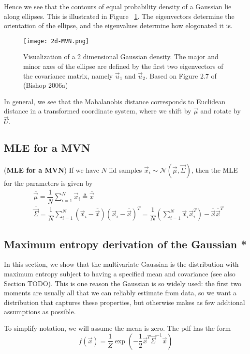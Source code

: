 Hence we see that the contours of equal probability density of a Gaussian lie along ellipses. This is illustrated in Figure ~\ref{fig:2d-MVN}. The eigenvectors determine the orientation of the ellipse, and the eigenvalues determine how elogonated it is.

\begin{figure}[hbtp]
\centering
    \texttt{[image: 2d-MVN.png]}
\caption{Visualization of a 2 dimensional Gaussian density. The major and minor axes of the ellipse are defined by the first two eigenvectors of the covariance matrix, namely $\vec{u}_1$ and $\vec{u}_2$. Based on Figure 2.7 of (Bishop 2006a)}
\label{fig:2d-MVN} 
\end{figure}

In general, we see that the Mahalanobis distance corresponds to Euclidean distance in a transformed coordinate system, where we shift by $\vec{\mu}$ and rotate by $\vec{U}$.


\subsection{MLE for a MVN}
\begin{theorem}(\textbf{MLE for a MVN})
If we have $N$ iid samples $\vec{x}_i \sim \mathcal{N}(\vec{\mu},\vec{\Sigma})$, then the MLE for the parameters is given by
\begin{align}
& \bar{\vec{\mu}}=\dfrac{1}{N}\sum\limits_{i=1}^N \vec{x}_i \triangleq \bar{\vec{x}} \\
& \bar{\vec{\Sigma}}=\dfrac{1}{N}\sum\limits_{i=1}^N (\vec{x}_i-\bar{\vec{x}})(\vec{x}_i-\bar{\vec{x}})^T=\dfrac{1}{N}\left(\sum\limits_{i=1}^N \vec{x}_i\vec{x}_i^T\right)-\bar{\vec{x}}\bar{\vec{x}}^T
\end{align}
\end{theorem}


\subsection{Maximum entropy derivation of the Gaussian *}
In this section, we show that the multivariate Gaussian is the distribution with maximum entropy subject to having a specified mean and covariance (see also Section TODO). This is one reason the Gaussian is so widely used: the first two moments are usually all that we can reliably estimate from data, so we want a distribution that captures these properties, but otherwise makes as few addtional assumptions as possible.

To simplify notation, we will assume the mean is zero. The pdf has the form
\begin{equation}
f(\vec{x})=\dfrac{1}{Z}\exp\left(-\dfrac{1}{2}\vec{x}^T\vec{\Sigma}^{-1}\vec{x}\right)
\end{equation}


